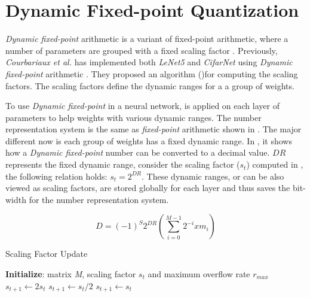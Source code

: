 \documentclass[a4paper,12pt]{report}
\begin{document}
\section{Dynamic Fixed-point Quantization}
\label{sec:dfq}
\textit{Dynamic fixed-point} arithmetic is a variant of fixed-point arithmetic,
where a number of parameters are grouped with a fixed scaling factor \cite{williamson1991dynamically}.
Previously, \textit{Courbariaux et al.} has implemented both \textit{LeNet5} and
\textit{CifarNet} using \textit{Dynamic fixed-point} arithmetic \cite{courbariaux2014training}.
They proposed an algorithm ()for computing the scaling factors.
The scaling factors define the dynamic ranges for a a group of weights.

To use \textit{Dynamic fixed-point} in a neural network, 
is applied  on each layer of parameters to help weights with various dynamic ranges.
The number representation system is the same as \textit{fixed-point} arithmetic
shown in .
The major different now is each group of weights has a fixed dynamic range.
In , it shows how a \textit{Dynamic fixed-point} number can be
converted to a decimal value.
$DR$ represents the fixed dynamic range, consider the scaling factor ($s_t$)
computed in , the following relation holds: $s_t = 2^{DR}$.
These dynamic ranges, or can be also viewed as scaling factors, are stored globally
for each layer and thus saves the bit-width for the number representation system.

\begin{equation}
    D = (-1)^S 2^{DR}(\sum^{M-1}_{i=0}2^{-i}xm_i)
    \label{equ:d2ddfp}
\end{equation}

\begin{algorithm}
\caption{Scaling Factor Update} \label{alg:scaling_factor}
\begin{algorithmic}[1]
\STATE \textbf{Initialize}: matrix \textit{M}, scaling factor $s_t$ and maximum overflow rate $r_{max}$
  \STATE $s_{t+1} \gets 2s_t$
  \STATE $s_{t+1} \gets s_t/2$
\ELSE
  \STATE $s_{t+1} \gets s_t$
\ENDIF
\ENDWHILE
\end{algorithmic}
\end{algorithm}
\end{document}
